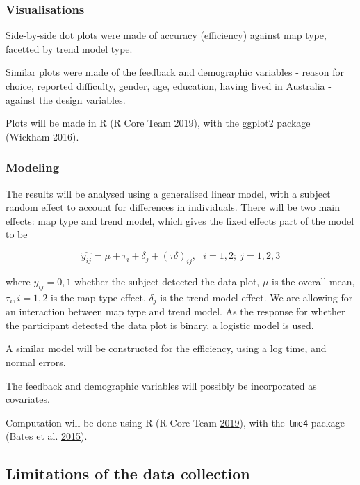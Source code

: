 \documentclass[conference,final,]{IEEEtran}
\begin{document}
\hypertarget{visualisations}{%
\subsubsection{Visualisations}\label{visualisations}}

Side-by-side dot plots were made of accuracy (efficiency) against map
type, facetted by trend model type.

Similar plots were made of the feedback and demographic variables -
reason for choice, reported difficulty, gender, age, education, having
lived in Australia - against the design variables.

Plots will be made in R (R Core Team 2019), with the ggplot2 package
(Wickham 2016).

\hypertarget{modeling}{%
\subsubsection{Modeling}\label{modeling}}

The results will be analysed using a generalised linear model, with a
subject random effect to account for differences in individuals. There
will be two main effects: map type and trend model, which gives the
fixed effects part of the model to be

\[\widehat{y_{ij}} = \mu + \tau_i + \delta_j + (\tau\delta)_{ij}, ~~~ i=1,2; ~j=1,2,3\]

where \(y_{ij} = 0, 1\) whether the subject detected the data plot,
\(\mu\) is the overall mean, \(\tau_i, i=1,2\) is the map type effect,
\(\delta_j\) is the trend model effect. We are allowing for an
interaction between map type and trend model. As the response for
whether the participant detected the data plot is binary, a logistic
model is used.

A similar model will be constructed for the efficiency, using a log
time, and normal errors.

The feedback and demographic variables will possibly be incorporated as
covariates.

Computation will be done using R (R Core Team
\protect\hyperlink{ref-RCore}{2019}), with the \texttt{lme4} package
(Bates et al. \protect\hyperlink{ref-lme4}{2015}).

\hypertarget{limitations-of-the-data-collection}{%
\subsection{Limitations of the data
collection}\label{limitations-of-the-data-collection}}
\end{document}

